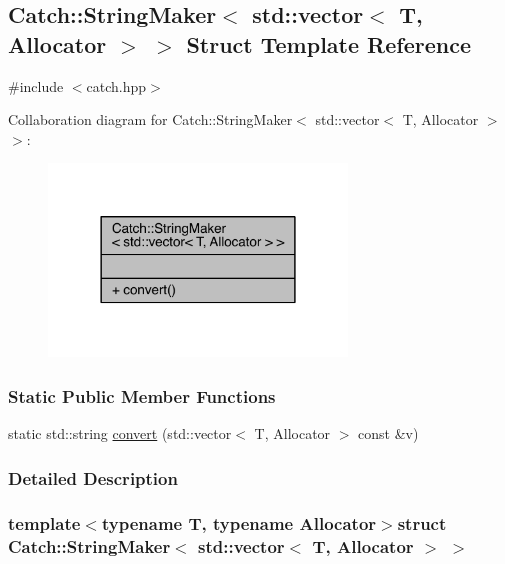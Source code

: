 \hypertarget{a00080}{}\subsection{Catch\+:\+:String\+Maker$<$ std\+:\+:vector$<$ T, Allocator $>$ $>$ Struct Template Reference}
\label{a00080}


{\ttfamily \#include $<$catch.\+hpp$>$}



Collaboration diagram for Catch\+:\+:String\+Maker$<$ std\+:\+:vector$<$ T, Allocator $>$ $>$\+:\nopagebreak
\begin{figure}[H]
\begin{center}
\leavevmode
\includegraphics[width=225pt]{a00277}
\end{center}
\end{figure}
\subsubsection*{Static Public Member Functions}
\begin{DoxyCompactItemize}
\item 
static std\+::string \hyperlink{a00080_adc7dc716733cea8777497257ae22e62d}{convert} (std\+::vector$<$ T, Allocator $>$ const \&v)
\end{DoxyCompactItemize}


\subsubsection{Detailed Description}
\subsubsection*{template$<$typename T, typename Allocator$>$struct Catch\+::\+String\+Maker$<$ std\+::vector$<$ T, Allocator $>$ $>$}



